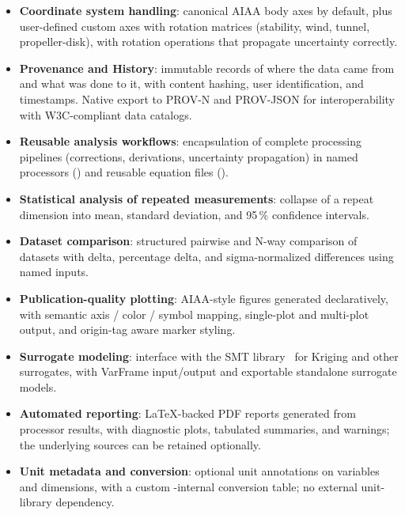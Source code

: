 \begin{itemize}
  \item \textbf{Coordinate system handling}: canonical AIAA body axes by
    default, plus user-defined custom axes with rotation matrices
    (stability, wind, tunnel, propeller-disk), with rotation operations
    that propagate uncertainty correctly.

  \item \textbf{Provenance and History}: immutable records of where the
    data came from and what was done to it, with content hashing, user
    identification, and timestamps. Native export to PROV-N and PROV-JSON
    for interoperability with W3C-compliant data catalogs.

  \item \textbf{Reusable analysis workflows}: encapsulation of complete
    processing pipelines (corrections, derivations, uncertainty
    propagation) in named processors () and reusable equation
    files ().

  \item \textbf{Statistical analysis of repeated measurements}: collapse
    of a repeat dimension into mean, standard deviation, and 95\,\%
    confidence intervals.

  \item \textbf{Dataset comparison}: structured pairwise and N-way
    comparison of datasets with delta, percentage delta, and
    sigma-normalized differences using named inputs.

  \item \textbf{Publication-quality plotting}: AIAA-style figures
    generated declaratively, with semantic axis / color / symbol mapping,
    single-plot and multi-plot output, and origin-tag aware marker styling.

  \item \textbf{Surrogate modeling}: interface with the SMT
    library~\citep{smt} for Kriging and other surrogates, with VarFrame
    input/output and exportable standalone surrogate models.

  \item \textbf{Automated reporting}: LaTeX-backed PDF reports generated
    from processor results, with diagnostic plots, tabulated summaries,
    and warnings; the underlying  sources can be retained
    optionally.

  \item \textbf{Unit metadata and conversion}: optional unit annotations
    on variables and dimensions, with a custom \itc{}-internal conversion
    table; no external unit-library dependency.
\end{itemize}

